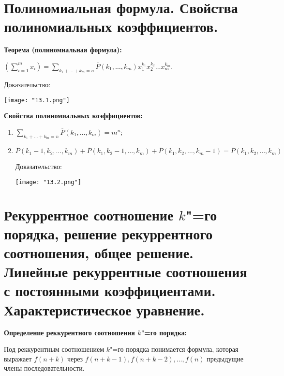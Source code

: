 \section{Полиномиальная формула. Свойства полиномиальных коэффициентов.}

\textbf{Теорема (полиномиальная формула):}
    \smallskip

    $\left(\sum\limits^m_{i = 1} x_i\right) = \sum\limits_{k_1 + \dots + k_m = n}
    \overline{P}(k_1, \dots, k_m) x_1^{k_1} x_2^{k_2} \dots x_m^{k_m}$.
    \bigskip

    Доказательство:

    \begin{center}
        \texttt{[image: "13.1.png"]}
    \end{center}
    \bigskip

\textbf{Свойства полиномиальных коэффициентов:}
    \smallskip
    
    \begin{enumerate}
        \item{$\sum\limits_{k_1 + \dots + k_m = n} \overline{P}(k_1, \dots, k_m) =
        m^n$;}
        \item{$\overline{P}(k_1 - 1, k_2, \dots, k_m) + 
        \overline{P}(k_1, k_2 - 1, \dots, k_m) + \overline{P}(k_1, k_2, \dots, k_m - 1) =
        \overline{P}(k_1, k_2, \dots, k_m)$
        \bigskip
        
        Доказательство:
        \bigskip
        
        \begin{center}
            \texttt{[image: "13.2.png"]}
        \end{center}
        }
    \end{enumerate}

\section{Рекуррентное соотношение $k$"=го порядка, решение рекуррентного соотношения, 
общее решение. Линейные рекуррентные соотношения с постоянными 
коэффициентами. Характеристическое уравнение.}    

\textbf{Определение реккурентного соотношения $k$"=го порядка:}
    \smallskip

    Под реккурентным соотношением $k$"=го порядка понимается формула,
    которая выражает $f(n + k)$ через $f(n + k - 1), f(n + k - 2), \dots,
    f(n)$ предыдущие члены последовательности.
    \bigskip

